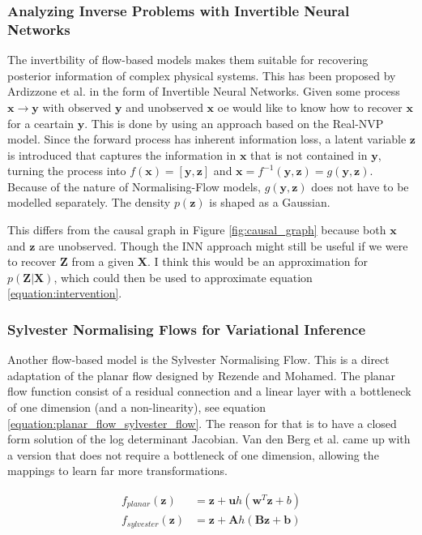 \documentclass{article}
\newcommand{\bA}{\mathbf{A}}
\newcommand{\bB}{\mathbf{B}}
\newcommand{\bb}{\mathbf{b}}
\newcommand{\bu}{\mathbf{u}}
\newcommand{\bw}{\mathbf{w}}
\newcommand{\bX}{\mathbf{X}}
\newcommand{\bx}{\mathbf{x}}
\newcommand{\by}{\mathbf{y}}
\newcommand{\bZ}{\mathbf{Z}}
\newcommand{\bz}{\mathbf{z}}
\begin{document}
\subsubsection*{Analyzing Inverse Problems with Invertible Neural Networks}
The invertbility of flow-based models makes them suitable for recovering posterior information of complex physical systems. This has been proposed by Ardizzone et al. \cite{ardizzone2018analyzing} in the form of Invertible Neural Networks. Given some process $\bx \rightarrow \by$ with observed $\by$ and unobserved $\bx$ oe would like to know how to recover $\bx$ for a ceartain $\by$. This is done by using an approach based on the Real-NVP\cite{dinh2016density} model. Since the forward process has inherent information loss, a latent variable $\bz$ is introduced that captures the information in $\bx$ that is not contained in $\by$, turning the process into $f(\bx) = [\by, \bz]$  and $\bx = f^{-1}(\by, \bz) = g(\by, \bz)$. Because of the nature of Normalising-Flow models, $g(\by, \bz)$ does not have to be modelled separately. The density $p(\bz)$ is shaped as a Gaussian. 

This differs from the causal graph in Figure \ref{fig:causal_graph} because both $\bx$ and $\bz$ are unobserved. Though the INN approach might still be useful if we were to recover $\bZ$ from a given $\bX$. I think this would be an approximation for $p(\bZ | \bX)$, which could then be used to approximate equation \ref{equation:intervention}. 


\subsubsection*{Sylvester Normalising Flows for Variational Inference}
Another flow-based model is the Sylvester Normalising Flow\cite{berg2018sylvester}. This is a direct adaptation of the planar flow designed by Rezende and Mohamed. The planar flow function consist of a residual connection and a linear layer with a bottleneck of one dimension (and a non-linearity), see equation \ref{equation:planar_flow_sylvester_flow}. The reason for that is to have a closed form solution of the log determinant Jacobian. Van den Berg et al. came up with a version that does not require a bottleneck of one dimension, allowing the mappings to learn far more transformations.

\begin{align}\label{equation:planar_flow_sylvester_flow}
    f_{planar}(\bz) &= \bz + \bu h(\bw^T\bz + b)\\
    f_{sylvester}(\bz) &= \bz + \bA h(\bB\bz + \bb)
\end{align}
\end{document}
